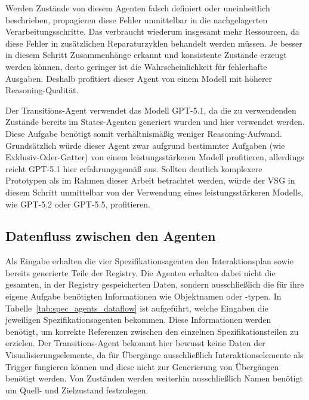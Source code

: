 Werden Zustände von diesem Agenten falsch definiert oder uneinheitlich beschrieben, propagieren diese Fehler unmittelbar in die nachgelagerten Verarbeitungsschritte. Das verbraucht wiederum insgesamt mehr Ressourcen, da diese Fehler in zusätzlichen Reparaturzyklen behandelt werden müssen. Je besser in diesem Schritt Zusammenhänge erkannt und konsistente Zustände erzeugt werden können, desto geringer ist die Wahrscheinlichkeit für fehlerhafte Ausgaben. Deshalb profitiert dieser Agent von einem Modell mit höherer Reasoning-Qualität.

Der Transitions-Agent verwendet das Modell GPT-5.1, da die zu verwendenden Zustände bereits im States-Agenten generiert wurden und hier verwendet werden. Diese Aufgabe benötigt somit verhältnismäßig weniger Reasoning-Aufwand. Grundsätzlich würde dieser Agent zwar aufgrund bestimmter Aufgaben (wie Exklusiv-Oder-Gatter) von einem leistungsstärkeren Modell profitieren, allerdings reicht GPT-5.1 hier erfahrungsgemäß aus. Sollten deutlich komplexere Prototypen als im Rahmen dieser Arbeit betrachtet werden, würde der VSG in diesem Schritt unmittelbar von der Verwendung eines leistungsstärkeren Modells, wie GPT-5.2 oder GPT-5.5, profitieren.


\subsection*{Datenfluss zwischen den Agenten}

Als Eingabe erhalten die vier Spezifikationsagenten den Interaktionsplan sowie bereits generierte Teile der Registry. Die Agenten erhalten dabei nicht die gesamten, in der Registry gespeicherten Daten, sondern ausschließlich die für ihre eigene Aufgabe benötigten Informationen wie Objektnamen oder -typen. In Tabelle~\ref{tab:spec_agents_dataflow} ist aufgeführt, welche Eingaben die jeweiligen Spezifikationsagenten bekommen. Diese Informationen werden benötigt, um korrekte Referenzen zwischen den einzelnen Spezifikationsteilen zu erzielen. Der Transitions-Agent bekommt hier bewusst keine Daten der Visualisierungselemente, da für Übergänge ausschließlich Interaktionselemente als Trigger fungieren können und diese nicht zur Generierung von Übergängen benötigt werden. Von Zuständen werden weiterhin ausschließlich Namen benötigt um Quell- und Zielzustand festzulegen.

